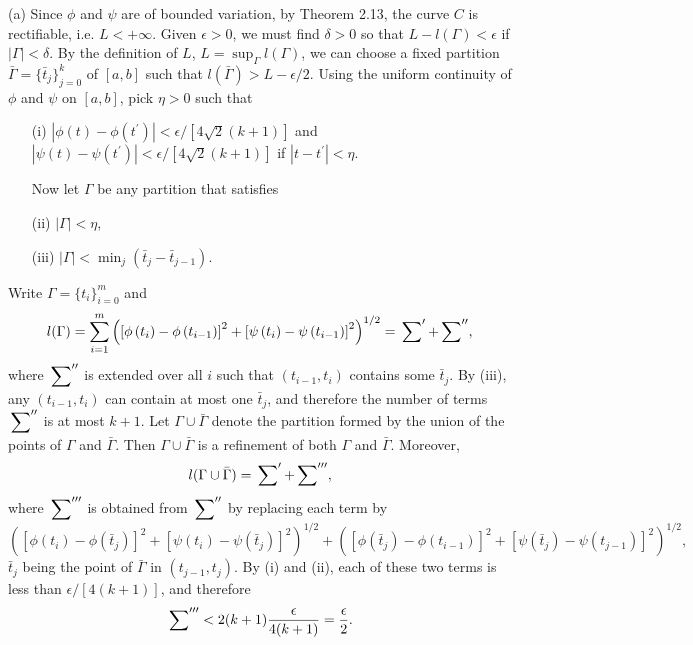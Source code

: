 \begin{exercise}{2.9}
(a)
  Since $\phi$ and $\psi$ are of bounded variation, by Theorem 2.13, the curve $C$ is rectifiable, i.e. $L<+\infty$. Given $\epsilon>0$, we must find $\delta>0$ so that $L-l(\Gamma)<\epsilon$ if $|\Gamma|<\delta$. By the definition of $L$, $L=\sup_{\Gamma}l(\Gamma)$, we can choose a fixed partition $\bar{\Gamma}=\{\bar{t}_j\}_{j=0}^k$ of $[a,b]$ such that $l(\bar{\Gamma})>L-\epsilon/2$. Using the uniform continuity of $\phi$ and $\psi$ on $[a,b]$, pick $\eta>0$ such that
  \begin{enumerate}
    \item[(i)] $|\phi(t)-\phi(t^\prime)|<\epsilon/[4\sqrt{2}(k+1)]$ and $|\psi(t)-\psi(t^\prime)|<\epsilon/[4\sqrt{2}(k+1)]$ if $|t-t^\prime|<\eta$.

    Now let $\Gamma$ be any partition that satisfies
    \item[(ii)] $|\Gamma|<\eta$,
    \item[(iii)] $|\Gamma|<\min_j(\bar{t}_j-\bar{t}_{j-1}).$
  \end{enumerate}
  Write $\Gamma=\{t_i\}_{i=0}^m$ and
  $$l(\Gamma)=\sum_{i=1}^{m}\left(\left[\phi\left(t_{i}\right)-\phi\left(t_{i-1}\right)\right]^{2}+\left[\psi\left(t_{i}\right)-\psi\left(t_{i-1}\right)\right]^{2}\right)^{1 / 2}=\sideset{}{'}{\sum}+\sideset{}{''}{\sum} ,$$
  where $\sideset{}{''}{\sum}$ is extended over all $i$ such that $(t_{i-1},t_i)$ contains some $\bar{t}_j$. By (iii), any $(t_{i-1},t_i)$ can  contain at most one $\bar{t}_j$, and therefore the number of terms  $\sideset{}{''}{\sum}$ is at most $k+1$. Let $\Gamma\cup\bar{\Gamma}$ denote the partition formed by the union of the points of $\Gamma$ and $\bar{\Gamma}$. Then $\Gamma\cup\bar{\Gamma}$ is a refinement of both $\Gamma$ and $\bar{\Gamma}$. Moreover, $$l(\Gamma\cup\bar{\Gamma})=\sideset{}{'}{\sum}+\sideset{}{'''}{\sum},$$
  where $\sideset{}{'''}{\sum}$ is obtained from $\sideset{}{''}{\sum}$ by replacing each term by $$\left(\left[\phi\left(t_{i}\right)-\phi\left(\bar{t}_j\right)\right]^{2}+\left[\psi\left(t_{i}\right)-\psi\left(\bar{t}_j\right)\right]^{2}\right)^{1 / 2}+\left(\left[\phi\left(\bar{t}_j\right)-\phi\left({t}_{i-1}\right)\right]^{2}+\left[\psi\left(\bar{t}_j\right)-\psi\left({t}_{j-1}\right)\right]^{2}\right)^{1 / 2},$$
  $\bar{t}_j$ being the point of $\bar{\Gamma}$ in $(t_{j-1},t_j)$. By (i) and (ii), each of these two terms is less than $\epsilon/[4(k+1)]$, and therefore
  \begin{equation*}
    \sideset{}{'''}{\sum}<2(k+1)\frac{\epsilon}{4(k+1)}=\frac{\epsilon}{2}.

\end{equation*}
\end{exercise}
